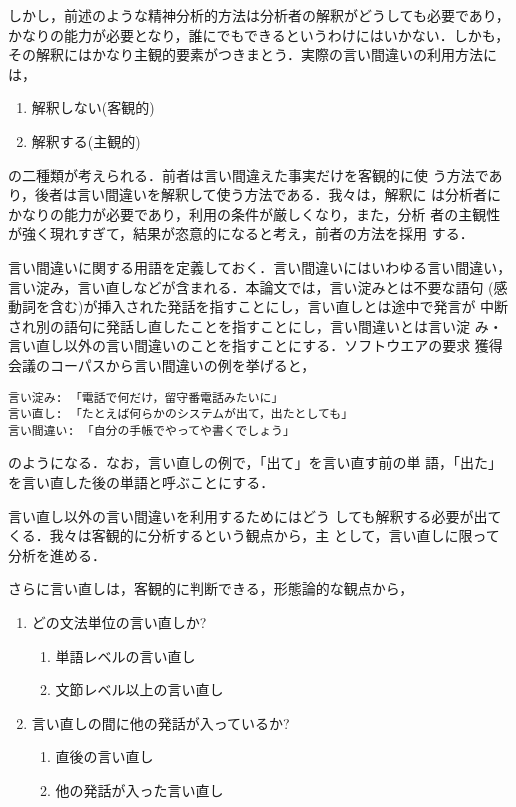 しかし，前述のような精神分析的方法は分析者の解釈がどうしても必要であり，
かなりの能力が必要となり，誰にでもできるというわけにはいかない．しかも，
その解釈にはかなり主観的要素がつきまとう．実際の言い間違いの利用方法に
は，

\begin{enumerate}
\item 解釈しない(客観的)
\item 解釈する(主観的)
\end{enumerate}

\noindent の二種類が考えられる．前者は言い間違えた事実だけを客観的に使
う方法であり，後者は言い間違いを解釈して使う方法である．我々は，解釈に
は分析者にかなりの能力が必要であり，利用の条件が厳しくなり，また，分析
者の主観性が強く現れすぎて，結果が恣意的になると考え，前者の方法を採用
する．

言い間違いに関する用語を定義しておく．言い間違いにはいわゆる言い間違い，
言い淀み，言い直しなどが含まれる．本論文では，言い淀みとは不要な語句
(感動詞を含む)が挿入された発話を指すことにし，言い直しとは途中で発言が
中断され別の語句に発話し直したことを指すことにし，言い間違いとは言い淀
み・言い直し以外の言い間違いのことを指すことにする．ソフトウエアの要求
獲得会議のコーパスから言い間違いの例を挙げると，

\begin{verbatim}
言い淀み: 「電話で何だけ，留守番電話みたいに」
言い直し: 「たとえば何らかのシステムが出て，出たとしても」
言い間違い: 「自分の手帳でやってや書くでしょう」
\end{verbatim}

\noindent のようになる．なお，言い直しの例で，「出て」を言い直す前の単
語，「出た」を言い直した後の単語と呼ぶことにする．

言い直し以外の言い間違いを利用するためにはどう
しても解釈する必要が出てくる．我々は客観的に分析するという観点から，主
として，言い直しに限って分析を進める．

さらに言い直しは，客観的に判断できる，形態論的な観点から，

\begin{enumerate}
\item\label{どの文法単位の言い直しか?} どの文法単位の言い直しか?
\begin{enumerate}
\item\label{単語レベルの言い直し} 単語レベルの言い直し
\item\label{文節レベル以上の言い直し} 文節レベル以上の言い直し
\end{enumerate}
\item\label{言い直しの間に他の発話が入っているか?} 言い直しの間に他の発話が入っているか?
\begin{enumerate}
\item\label{直後の言い直し} 直後の言い直し
\item\label{他の発話が入った言い直し} 他の発話が入った言い直し
\end{enumerate}
\end{enumerate}

